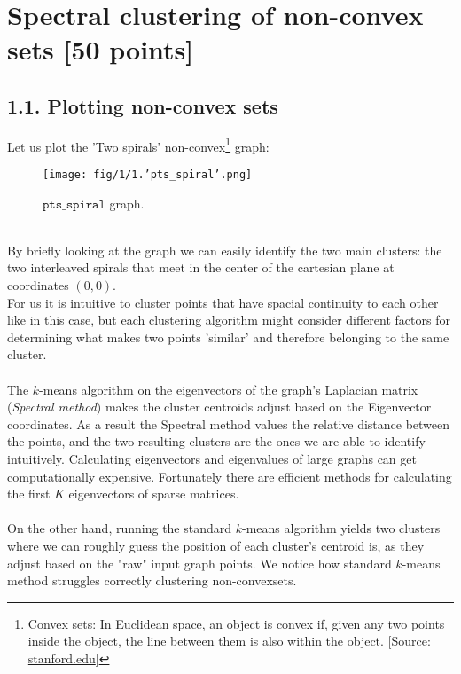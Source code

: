 \documentclass[unicode,11pt,a4paper,oneside,numbers=endperiod,openany]{scrartcl}
\begin{document}
\setassignment
{}

\newline

\assignmentpolicy
\tableofcontents
\newpage

\section{Spectral clustering of non-convex sets [50 points]}
\subsection*{1.1. Plotting non-convex sets}
Let us plot the 'Two spirals' non-convex\footnote{Convex sets: In Euclidean space, an object is convex if, given any two points inside the object, the line between them is also within the object. [Source: \href{https://web.stanford.edu/class/ee364a/lectures/sets.pdf}{stanford.edu}]} graph:\\
\begin{figure}[h!]
    \centering
    \texttt{[image: fig/1/1.'pts\_spiral'.png]}
    \caption{$\texttt {pts\_spiral}$ graph.}
    \label{fig:pts_spiral}
\end{figure}\\
By briefly looking at the graph we can easily identify the two main clusters: the two interleaved spirals that meet in the center of the cartesian plane at coordinates $(0,0)$.\\
For us it is intuitive to cluster points that have spacial continuity to each other like in this case, but each clustering algorithm might consider different factors for determining what makes two points 'similar' and therefore belonging to the same cluster.\\\\
The $k$-means algorithm on the eigenvectors of the graph's Laplacian matrix (\textit{Spectral method}) makes the cluster centroids adjust based on the Eigenvector coordinates. As a result the Spectral method values the relative distance between the points, and the two resulting clusters are the ones we are able to identify intuitively. Calculating eigenvectors and eigenvalues of large graphs can get computationally expensive. Fortunately there are efficient methods for calculating the first $K$ eigenvectors of sparse matrices. \\\\
On the other hand, running the standard $k$-means algorithm yields two clusters where we can roughly guess the position of each cluster's centroid is, as they adjust based on the "raw" input graph points. We notice how standard $k$-means method struggles correctly clustering non-convex\footnotemark[1] sets. \\
\end{document}
